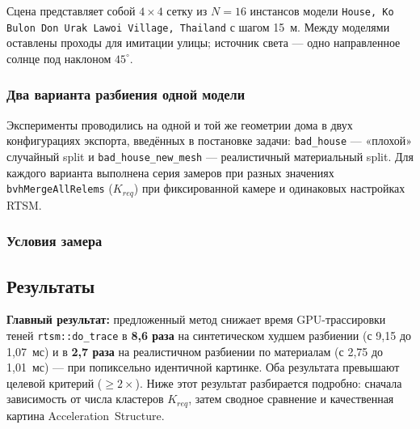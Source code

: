 Сцена представляет собой $4\!\times\!4$ сетку из $N\!=\!16$
инстансов модели \texttt{House, Ko Bulon Don Urak Lawoi Village, Thailand} с шагом 15~м. Между моделями
оставлены проходы для имитации улицы; источник света --- одно
направленное солнце под наклоном $45^\circ$.

\subsubsection{Два варианта разбиения одной модели}

Эксперименты проводились на одной и той же геометрии дома в двух конфигурациях экспорта,
введённых в постановке задачи: \texttt{bad\_house} --- «плохой»
случайный split и
\texttt{bad\_house\_new\_mesh} --- реалистичный материальный split. Для каждого
варианта выполнена серия замеров при разных значениях
\texttt{bvhMergeAllRelems} ($K_{req}$) при фиксированной камере
и одинаковых настройках RTSM.

\subsubsection{Условия замера}


\subsection{Результаты}

\textbf{Главный результат:} предложенный метод снижает время
GPU-трассировки теней \texttt{rtsm::do\_trace} в \textbf{8{,}6 раза}
на синтетическом худшем разбиении (с 9,15 до 1,07~мс)
и в \textbf{2{,}7 раза} на реалистичном разбиении по материалам
(с 2,75 до 1,01~мс) --- при попиксельно идентичной картинке.
Оба результата превышают целевой критерий ($\ge\!2\times$). Ниже
этот результат разбирается подробно: сначала зависимость от числа кластеров
$K_{req}$, затем сводное сравнение и качественная картина
Acceleration~Structure.

